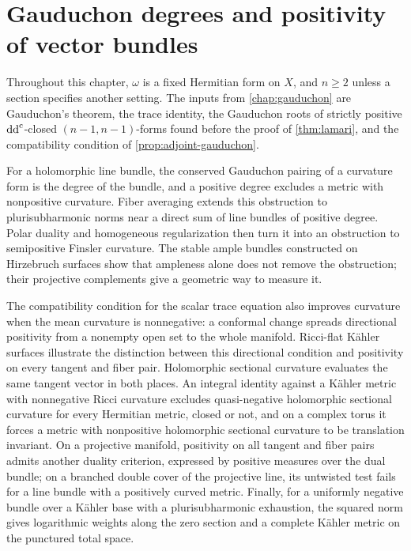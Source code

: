 \chapter{Gauduchon degrees and positivity of vector bundles}
\label{chap:gauduchon-bundle-positivity}

Throughout this chapter, $\omega$ is a fixed Hermitian form on $X$, and $n\geq2$ unless a section specifies another setting. The inputs from \cref{chap:gauduchon} are Gauduchon's theorem, the trace identity, the Gauduchon roots of strictly positive $\mathrm{dd}^{\mathrm{c}}$-closed $(n-1,n-1)$-forms found before the proof of \cref{thm:lamari}, and the compatibility condition of \cref{prop:adjoint-gauduchon}.

For a holomorphic line bundle, the conserved Gauduchon pairing of a curvature form is the degree of the bundle, and a positive degree excludes a metric with nonpositive curvature. Fiber averaging extends this obstruction to plurisubharmonic norms near a direct sum of line bundles of positive degree. Polar duality and homogeneous regularization then turn it into an obstruction to semipositive Finsler curvature. The stable ample bundles constructed on Hirzebruch surfaces show that ampleness alone does not remove the obstruction; their projective complements give a geometric way to measure it.

The compatibility condition for the scalar trace equation also improves curvature when the mean curvature is nonnegative: a conformal change spreads directional positivity from a nonempty open set to the whole manifold. Ricci-flat K\"ahler surfaces illustrate the distinction between this directional condition and positivity on every tangent and fiber pair. Holomorphic sectional curvature evaluates the same tangent vector in both places. An integral identity against a K\"ahler metric with nonnegative Ricci curvature excludes quasi-negative holomorphic sectional curvature for every Hermitian metric, closed or not, and on a complex torus it forces a metric with nonpositive holomorphic sectional curvature to be translation invariant. On a projective manifold, positivity on all tangent and fiber pairs admits another duality criterion, expressed by positive measures over the dual bundle; on a branched double cover of the projective line, its untwisted test fails for a line bundle with a positively curved metric. Finally, for a uniformly negative bundle over a K\"ahler base with a plurisubharmonic exhaustion, the squared norm gives logarithmic weights along the zero section and a complete K\"ahler metric on the punctured total space.








